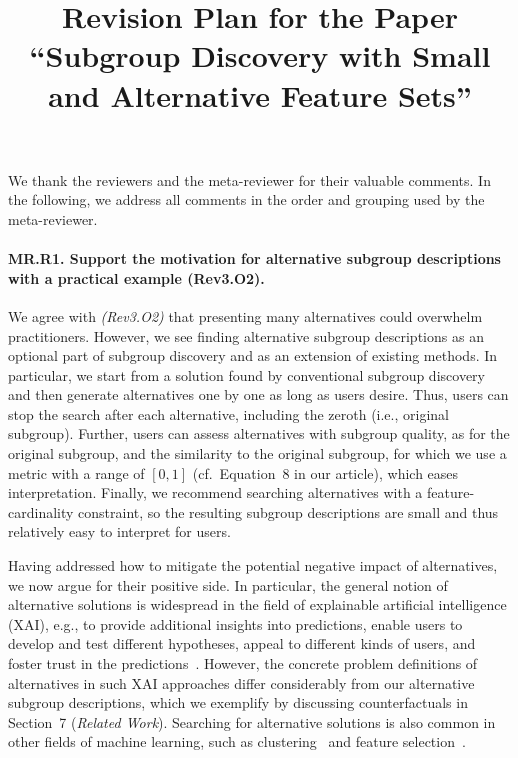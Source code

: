 \documentclass{article}
\title{\vspace{-15mm}Revision Plan for the Paper ``Subgroup Discovery with Small and Alternative Feature Sets''} %
\author{} %
\date{} %
\begin{document}
\maketitle
\vspace{-15mm}

We thank the reviewers and the meta-reviewer for their valuable comments.
In the following, we address all comments in the order and grouping used by the meta-reviewer.

\paragraph{MR.R1. Support the motivation for alternative subgroup descriptions with a practical example (Rev3.O2).}

We agree with \emph{(Rev3.O2)} that presenting many alternatives could overwhelm practitioners.
However, we see finding alternative subgroup descriptions as an optional part of subgroup discovery and as an extension of existing methods.
In particular, we start from a solution found by conventional subgroup discovery and then generate alternatives one by one as long as users desire.
Thus, users can stop the search after each alternative, including the zeroth (i.e., original subgroup).
Further, users can assess alternatives with subgroup quality, as for the original subgroup, and the similarity to the original subgroup, for which we use a metric with a range of $[0, 1]$ (cf.~Equation~8 in our article), which eases interpretation.
Finally, we recommend searching alternatives with a feature-cardinality constraint, so the resulting subgroup descriptions are small and thus relatively easy to interpret for users.

Having addressed how to mitigate the potential negative impact of alternatives, we now argue for their positive side.
In particular, the general notion of alternative solutions is widespread in the field of explainable artificial intelligence (XAI), e.g., to provide additional insights into predictions, enable users to develop and test different hypotheses, appeal to different kinds of users, and foster trust in the predictions~\cite{kim2021multi, wang2019designing}.
However, the concrete problem definitions of alternatives in such XAI approaches differ considerably from our alternative subgroup descriptions, which we exemplify by discussing counterfactuals in Section~7 (\emph{Related Work}).
Searching for alternative solutions is also common in other fields of machine learning, such as clustering~\cite{bailey2014alternative} and feature selection~\cite{bach2024alternative}.
\end{document}
